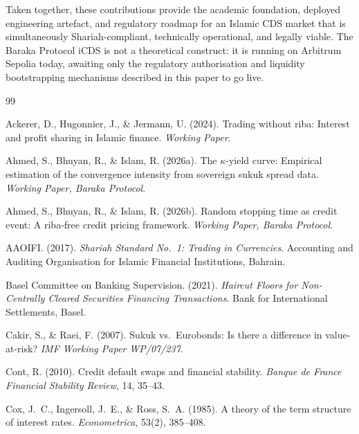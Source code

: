 \documentclass[12pt]{article}
\theoremstyle{plain}
\theoremstyle{definition}
\theoremstyle{remark}
\begin{document}
Taken together, these contributions provide the academic foundation,
deployed engineering artefact, and regulatory roadmap for an Islamic CDS
market that is simultaneously Shariah-compliant, technically operational,
and legally viable.
The Baraka Protocol iCDS is not a theoretical construct: it is running on
Arbitrum Sepolia today, awaiting only the regulatory authorisation and
liquidity bootstrapping mechanisms described in this paper to go live.




\begin{thebibliography}{99}

Ackerer, D., Hugonnier, J., \& Jermann, U. (2024).
\newblock Trading without riba: Interest and profit sharing in Islamic finance.
\newblock \emph{Working Paper}.

Ahmed, S., Bhuyan, R., \& Islam, R. (2026a).
\newblock The $\kappa$-yield curve: Empirical estimation of the convergence
  intensity from sovereign sukuk spread data.
\newblock \emph{Working Paper, Baraka Protocol}.

Ahmed, S., Bhuyan, R., \& Islam, R. (2026b).
\newblock Random stopping time as credit event: A riba-free credit pricing
  framework.
\newblock \emph{Working Paper, Baraka Protocol}.

AAOIFI. (2017).
\newblock \emph{Shariah Standard No.\ 1: Trading in Currencies}.
\newblock Accounting and Auditing Organisation for Islamic Financial
  Institutions, Bahrain.

Basel Committee on Banking Supervision. (2021).
\newblock \emph{Haircut Floors for Non-Centrally Cleared Securities Financing
  Transactions}.
\newblock Bank for International Settlements, Basel.

Cakir, S., \& Raei, F. (2007).
\newblock Sukuk vs.\ Eurobonds: Is there a difference in value-at-risk?
\newblock \emph{IMF Working Paper WP/07/237}.

Cont, R. (2010).
\newblock Credit default swaps and financial stability.
\newblock \emph{Banque de France Financial Stability Review}, 14, 35--43.

Cox, J.~C., Ingersoll, J.~E., \& Ross, S.~A. (1985).
\newblock A theory of the term structure of interest rates.
\newblock \emph{Econometrica}, 53(2), 385--408.


\end{thebibliography}
\end{document}

